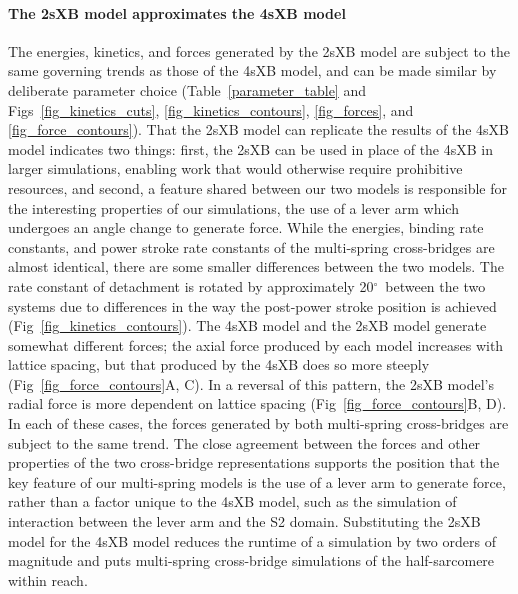 \documentclass[10pt]{article}
\newcommand{\de}{$^\circ$} %
\begin{document}
\paragraph*{The 2sXB model approximates the 4sXB model} %
The energies, kinetics, and forces generated by the 2sXB model are subject to the same governing trends as those of the 4sXB model, and can be made similar by deliberate parameter choice (Table~\ref{parameter_table} and Figs~\ref{fig_kinetics_cuts}, \ref{fig_kinetics_contours}, \ref{fig_forces}, and \ref{fig_force_contours}). 
That the 2sXB model can replicate the results of the 4sXB model indicates two things: first, the 2sXB can be used in place of the 4sXB in larger simulations, enabling work that would otherwise require prohibitive resources, and second, a feature shared between our two models is responsible for the interesting properties of our simulations, the use of a lever arm which undergoes an angle change to generate force. 
While the energies, binding rate constants, and power stroke rate constants of the multi-spring cross-bridges are almost identical, there are some smaller differences between the two models. 
The rate constant of detachment is rotated by approximately 20\de~between the two systems due to differences in the way the post-power stroke position is achieved (Fig~\ref{fig_kinetics_contours}).
The 4sXB model and the 2sXB model generate somewhat different forces; the axial force produced by each model increases with lattice spacing, but that produced by the 4sXB does so more steeply (Fig~\ref{fig_force_contours}A, C). 
In a reversal of this pattern, the 2sXB model's radial force is more dependent on lattice spacing (Fig~\ref{fig_force_contours}B, D).  
In each of these cases, the forces generated by both multi-spring cross-bridges are subject to the same trend.
The close agreement between the forces and other properties of the two cross-bridge representations supports the position that the key feature of our multi-spring models is the use of a lever arm to generate force, rather than a factor unique to the 4sXB model, such as the simulation of interaction between the lever arm and the S2 domain. 
Substituting the 2sXB model for the 4sXB model reduces the runtime of a simulation by two orders of magnitude and puts multi-spring cross-bridge simulations of the half-sarcomere within reach.
\end{document}
